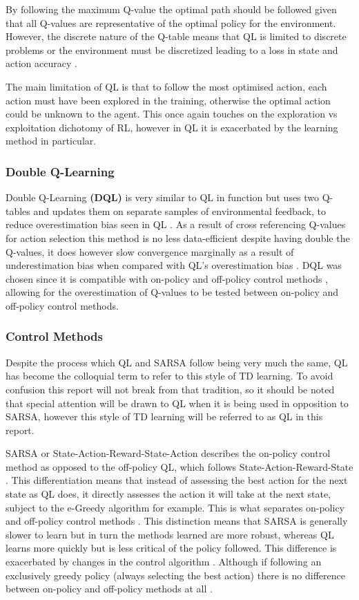 \documentclass[hidelinks,journal]{IEEEtran}
\begin{document}
By following the maximum Q-value the optimal path should be followed given that all Q-values are representative of the optimal policy for the environment. However, the discrete nature of the Q-table means that QL is limited to discrete problems or the environment must be discretized leading to a loss in state and action accuracy \parencite{Gaskett99}.

The main limitation of QL is that to follow the most optimised action, each action must have been explored in the training, otherwise the optimal action could be unknown to the agent. This once again touches on the exploration vs exploitation dichotomy of RL, however in QL it is exacerbated by the learning method in particular.
\subsubsection{Double Q-Learning}
\label{subsubsec:indBgDql}
Double Q-Learning \textbf{(DQL)} is very similar to QL in function but uses two Q-tables and updates them on separate samples of environmental feedback, to reduce overestimation bias seen in QL \parencite{Hasselt10}. As a result of cross referencing Q-values for action selection this method is no less data-efficient despite having double the Q-values, it does however slow convergence marginally as a result of underestimation bias when compared with QL’s overestimation bias \parencite{Hasselt10}. DQL was chosen since it is compatible with on-policy and off-policy control methods \parencite{Sutton18}, allowing for the overestimation of Q-values to be tested between on-policy and off-policy control methods.

\subsubsection{Control Methods}
\label{subsubsec:intBgCm}
Despite the process which QL and SARSA follow being very much the same, QL has become the colloquial term to refer to this style of TD learning. To avoid confusion this report will not break from that tradition, so it should be noted that special attention will be drawn to QL when it is being used in opposition to SARSA, however this style of TD learning will be referred to as QL in this report.

SARSA or State-Action-Reward-State-Action describes the on-policy control method as opposed to the off-policy QL, which follows State-Action-Reward-State \parencite{Sutton18}. This differentiation means that instead of assessing the best action for the next state as QL does, it directly assesses the action it will take at the next state, subject to the e-Greedy algorithm for example. This is what separates on-policy and off-policy control methods \parencite{Sutton18}. This distinction means that SARSA is generally slower to learn but in turn the methods learned are more robust, whereas QL learns more quickly but is less critical of the policy followed. This difference is exacerbated by changes in the control algorithm \parencite{Sutton18}. Although if following an exclusively greedy policy (always selecting the best action) there is no difference between on-policy and off-policy methods at all \parencite{Sutton18}.
\end{document}
